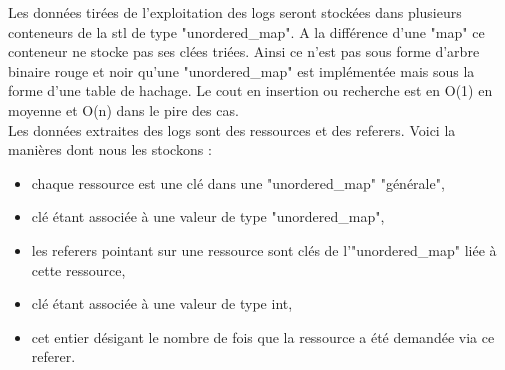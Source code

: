 \documentclass[a4paper]{article}
\begin{document}
Les données tirées de l'exploitation des logs seront stockées dans plusieurs conteneurs de la stl de type "unordered\_map". A la différence d'une "map" ce conteneur ne stocke pas ses clées triées. Ainsi ce n'est pas sous forme d'arbre binaire rouge et noir qu'une "unordered\_map" est implémentée mais sous la forme d'une table de hachage. Le cout en insertion ou recherche est en O(1) en moyenne et O(n) dans le pire des cas. 
\\
Les données extraites des logs sont des ressources et des referers. Voici la manières dont nous les stockons :
\begin{itemize}
\item chaque ressource est une clé dans une "unordered\_map" "générale",
\item clé étant associée à une valeur de type "unordered\_map",
\item les referers pointant sur une ressource sont clés de l'"unordered\_map" liée à cette ressource,
\item clé étant associée à une valeur de type int,
\item cet entier désigant le nombre de fois que la ressource a été demandée via ce referer.
\end{itemize}
\vspace*{\fill}
\end{document}
